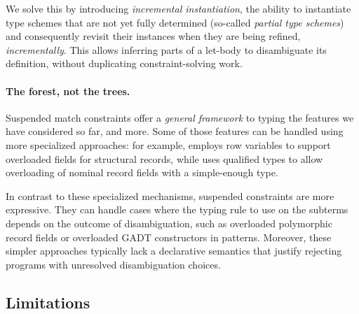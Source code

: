 \documentclass[acmsmall,screen,nonacm%
\Anonymous{,anonymous}{}%
\Final{}{,review}%
]{acmart}
\begin{document}

We solve this by introducing \emph{incremental instantiation}, \ie the ability
to instantiate type schemes that are not yet fully determined (so-called
\emph{partial type schemes}) and consequently revisit their instances when they
are being refined, \emph{incrementally}. This allows inferring parts of a
let-body to disambiguate its definition, without duplicating
constraint-solving work.


\paragraph {The forest, not the trees.}

Suspended match constraints offer a \emph{general framework} to typing the
features we have considered so far, and more. Some of those features can be
handled using more specialized approaches: for example, \SML employs row
variables to support overloaded fields for structural records, while \GHC uses
qualified types to allow overloading of nominal record fields with a
simple-enough type.


In contrast to these specialized mechanisms, suspended constraints are more
expressive. They can handle cases where the typing rule to use on the subterms
depends on the outcome of disambiguation, such as overloaded polymorphic record
fields or overloaded GADT constructors in patterns.
%
Moreover, these simpler approaches typically lack a declarative semantics that
justify rejecting programs with unresolved disambiguation choices.

\subsection{Limitations}
\label{sec/overview/limitations}


\end{document}
